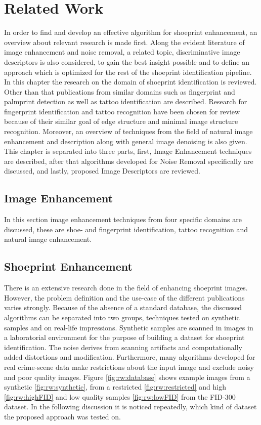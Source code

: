 \documentclass[draft,final]{vutinfth} %
\begin{document}
\chapter{Related Work}
\par
In order to find and develop an effective algorithm for shoeprint enhancement, an overview about relevant research is made first.
Along the evident literature of image enhancement and noise removal, a related topic, discriminative image descriptors is also considered, to gain the best insight possible and to define an approach which is optimized for the rest of the shoeprint identification pipeline.
In this chapter the research on the domain of shoeprint identification is reviewed.
Other than that publications from similar domains such as fingerprint and palmprint detection as well as tattoo identification are described.
Research for fingerprint identification and tattoo recognition have been chosen for review because of their similar goal of edge structure and minimal image structure recognition.
Moreover, an overview of techniques from the field of natural image enhancement and description along with general image denoising is also given.
This chapter is separated into three parts, first, Image Enhancement techniques are described, after that algorithms developed for Noise Removal specifically are discussed, and lastly, proposed Image Descriptors are reviewed.


\section{Image Enhancement}
\label{sec:rw:ImageENhancement}

In this section image enhancement techniques from four specific domains are discussed, these are shoe- and fingerprint identification, tattoo recognition and natural image enhancement.

\section*{Shoeprint Enhancement}

\par
There is an extensive research done in the field of enhancing shoeprint images.
However,  the problem definition and the use-case of the different publications varies strongly.
Because of the absence of a standard database, the discussed algorithms can be separated into two groups, techniques tested on synthetic samples and on real-life impressions.
Synthetic samples are scanned in images in a laboratorial environment for the purpose of building a dataset for shoeprint identification.
The noise derives from scanning artifacts and computationally added distortions and modification.
Furthermore, many algorithms developed for real crime-scene data make restrictions about the input image and exclude noisy and poor quality images.
Figure \ref{fig:rw:database} shows example images from a synthetic \ref{fig:rw:synthetic}, from a restricted \ref{fig:rw:restricted} and high \ref{fig:rw:highFID} and low quality samples \ref{fig:rw:lowFID} from the FID-300 dataset.
In the following discussion it is noticed repeatedly, which kind of dataset the proposed approach was tested on.
\end{document}
